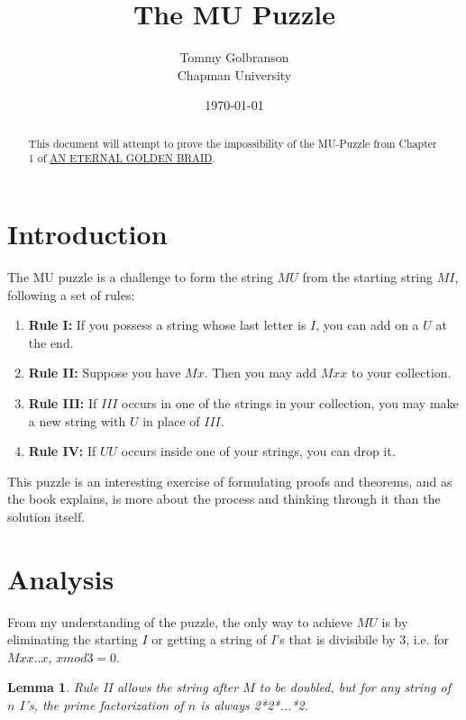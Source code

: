 \documentclass{article}
\title{The MU Puzzle}
\author{Tommy Golbranson\\ Chapman University}
\date{\today}
\theoremstyle{plain}
\newtheorem{lemma}[theorem]{Lemma}
\theoremstyle{definition}
\theoremstyle{remark}
\begin{document}
\maketitle

\begin{abstract}
This document will attempt to prove the impossibility of the MU-Puzzle from Chapter 1 of \href{https://www.physixfan.com/wp-content/files/GEBen.pdf}{AN ETERNAL GOLDEN BRAID}.
\end{abstract}

\tableofcontents

\section{Introduction}

The MU puzzle is a challenge to form the string $MU$ from the starting string $MI$, following a set of rules:

\begin{enumerate}
    \item \textbf{Rule I:} If you possess a string whose last letter is $I$, you can add on a $U$ at the end. 
    \item \textbf{Rule II:} Suppose you have $Mx$. Then you may add $Mxx$ to your collection. 
    \item \textbf{Rule III:} If $III$ occurs in one of the strings in your collection, you may make a new
    string with $U$ in place of $III$.
    \item \textbf{Rule IV:} If $UU$ occurs inside one of your strings, you can drop it.
\end{enumerate}
This puzzle is an interesting exercise of formulating proofs and theorems, and as the book explains, is more about the process and thinking through it than the solution itself.

\section{Analysis}
From my understanding of the puzzle, the only way to achieve $MU$ is by eliminating the starting $I$ or getting a string of $I$'s that is divisibile by 3, i.e. for $Mxx..x$, $x mod 3 = 0$.

\begin{lemma}
Rule II allows the string after $M$ to be doubled, but for any string of $n$ $I$'s, the prime factorization of $n$ is always 2*2*...*2.
\end{lemma}
\end{document}
